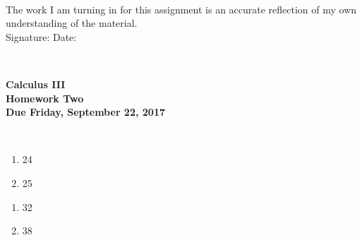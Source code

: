 \documentclass[12pt]{article}
\begin{document}
\\

\bigskip
\bigskip
\bigskip
\bigskip
\bigskip
\bigskip
\noindent The work I am turning in for this assignment is an accurate
reflection of my own understanding of the material.\\[14pt]

\noindent Signature: \underline{\hspace{7cm}} \hspace{1cm} Date:
\underline{\hspace{5cm}} 


\hspace{2mm}\\
\newpage



 
\begin{center}
{\large {\bf Calculus III}}\\
\medskip
{\large {\bf Homework Two}}\\
\medskip
{ {\bf Due Friday, September 22, 2017}}\\
\end{center}

\hspace{2mm}\\



\begin{enumerate}
\setlength{\itemsep}{-1mm}
  \item 24
  \item 25
\end{enumerate}

\begin{enumerate}
\setlength{\itemsep}{-1mm}
  \item 32
  \item 38
\end{enumerate}
\end{document}
